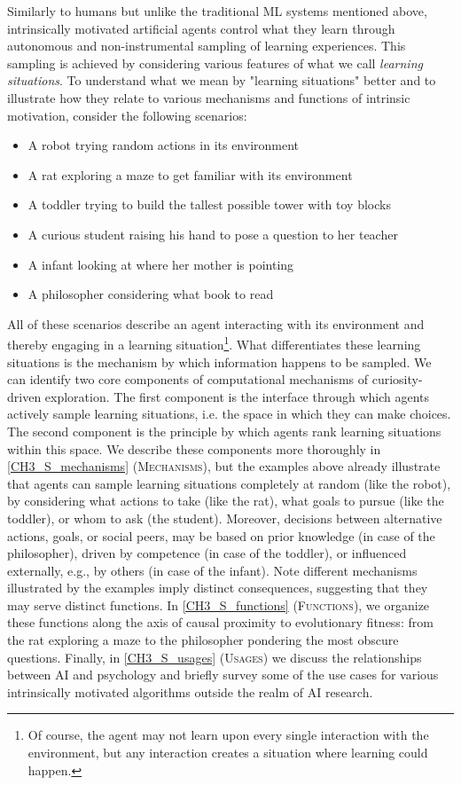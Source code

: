 Similarly to humans but unlike the traditional \ac{ML} systems mentioned above, intrinsically motivated artificial agents control what they learn through autonomous and non-instrumental sampling of learning experiences. This sampling is achieved by considering various features of what we call \emph{learning situations}. To understand what we mean by "learning situations" better and to illustrate how they relate to various mechanisms and functions of intrinsic motivation, consider the following scenarios:

\begin{itemize}
    \item A robot trying random actions in its environment
    \item A rat exploring a maze to get familiar with its environment
    \item A toddler trying to build the tallest possible tower with toy blocks
    \item A curious student raising his hand to pose a question to her teacher
    \item A infant looking at where her mother is pointing
    \item A philosopher considering what book to read
\end{itemize}

All of these scenarios describe an agent interacting with its environment and thereby engaging in a learning situation\footnote{Of course, the agent may not learn upon every single interaction with the environment, but any interaction creates a situation where learning could happen.}. What differentiates these learning situations is the mechanism by which information happens to be sampled. We can identify two core components of computational mechanisms of curiosity-driven exploration. The first component is the interface through which agents actively sample learning situations, i.e. the space in which they can make choices. The second component is the principle by which agents rank learning situations within this space. We describe these components more thoroughly in \cref{CH3_S_mechanisms} (\textsc{Mechanisms}), but the examples above already illustrate that agents can sample learning situations completely at random (like the robot), by considering what actions to take (like the rat), what goals to pursue (like the toddler), or whom to ask (the student). Moreover, decisions between alternative actions, goals, or social peers, may be based on prior knowledge (in case of the philosopher), driven by competence (in case of the toddler), or influenced externally, e.g., by others (in case of the infant). Note different mechanisms illustrated by the examples imply distinct consequences, suggesting  that they may serve distinct functions. In \cref{CH3_S_functions} (\textsc{Functions}), we organize these functions along the axis of causal proximity to evolutionary fitness: from the rat exploring a maze to the philosopher pondering the most obscure questions. Finally, in \cref{CH3_S_usages} (\textsc{Usages}) we discuss the relationships between \ac{AI} and psychology and briefly survey some of the use cases for various intrinsically motivated algorithms outside the realm of \ac{AI} research.

